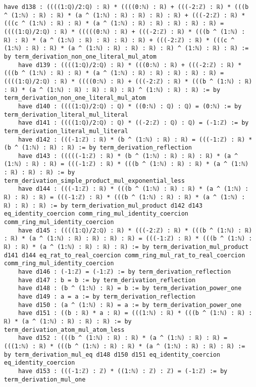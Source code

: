 \documentclass{article}
\begin{document}
\begin{tcolorbox}[colback=white!10, width=\linewidth]
\begin{lstlisting}[language=Lean4]
    have d138 : ((((1:ℚ)/2:ℚ) : ℝ) * ((((0:ℕ) : ℝ) + (((-2:ℤ) : ℝ) * (((b ^ (1:ℕ) : ℝ) : ℝ) * (a ^ (1:ℕ) : ℝ) : ℝ) : ℝ) : ℝ) + (((-2:ℤ) : ℝ) * (((c ^ (1:ℕ) : ℝ) : ℝ) * (a ^ (1:ℕ) : ℝ) : ℝ) : ℝ) : ℝ) : ℝ) = ((((1:ℚ)/2:ℚ) : ℝ) * (((((0:ℕ) : ℝ) + (((-2:ℤ) : ℝ) * (((b ^ (1:ℕ) : ℝ) : ℝ) * (a ^ (1:ℕ) : ℝ) : ℝ) : ℝ) : ℝ) + (((-2:ℤ) : ℝ) * (((c ^ (1:ℕ) : ℝ) : ℝ) * (a ^ (1:ℕ) : ℝ) : ℝ) : ℝ) : ℝ) ^ (1:ℕ) : ℝ) : ℝ) := by term_derivation_non_one_literal_mul_atom
    have d139 : ((((1:ℚ)/2:ℚ) : ℝ) * (((0:ℕ) : ℝ) + (((-2:ℤ) : ℝ) * (((b ^ (1:ℕ) : ℝ) : ℝ) * (a ^ (1:ℕ) : ℝ) : ℝ) : ℝ) : ℝ) : ℝ) = ((((1:ℚ)/2:ℚ) : ℝ) * ((((0:ℕ) : ℝ) + (((-2:ℤ) : ℝ) * (((b ^ (1:ℕ) : ℝ) : ℝ) * (a ^ (1:ℕ) : ℝ) : ℝ) : ℝ) : ℝ) ^ (1:ℕ) : ℝ) : ℝ) := by term_derivation_non_one_literal_mul_atom
    have d140 : ((((1:ℚ)/2:ℚ) : ℚ) * ((0:ℕ) : ℚ) : ℚ) = (0:ℕ) := by term_derivation_literal_mul_literal
    have d141 : ((((1:ℚ)/2:ℚ) : ℚ) * ((-2:ℤ) : ℚ) : ℚ) = (-1:ℤ) := by term_derivation_literal_mul_literal
    have d142 : (((-1:ℤ) : ℝ) * (b ^ (1:ℕ) : ℝ) : ℝ) = (((-1:ℤ) : ℝ) * (b ^ (1:ℕ) : ℝ) : ℝ) := by term_derivation_reflection
    have d143 : (((((-1:ℤ) : ℝ) * (b ^ (1:ℕ) : ℝ) : ℝ) : ℝ) * (a ^ (1:ℕ) : ℝ) : ℝ) = (((-1:ℤ) : ℝ) * (((b ^ (1:ℕ) : ℝ) : ℝ) * (a ^ (1:ℕ) : ℝ) : ℝ) : ℝ) := by term_derivation_simple_product_mul_exponential_less
    have d144 : (((-1:ℤ) : ℝ) * (((b ^ (1:ℕ) : ℝ) : ℝ) * (a ^ (1:ℕ) : ℝ) : ℝ) : ℝ) = (((-1:ℤ) : ℝ) * (((b ^ (1:ℕ) : ℝ) : ℝ) * (a ^ (1:ℕ) : ℝ) : ℝ) : ℝ) := by term_derivation_mul_product d142 d143 eq_identity_coercion comm_ring_mul_identity_coercion comm_ring_mul_identity_coercion
    have d145 : ((((1:ℚ)/2:ℚ) : ℝ) * (((-2:ℤ) : ℝ) * (((b ^ (1:ℕ) : ℝ) : ℝ) * (a ^ (1:ℕ) : ℝ) : ℝ) : ℝ) : ℝ) = (((-1:ℤ) : ℝ) * (((b ^ (1:ℕ) : ℝ) : ℝ) * (a ^ (1:ℕ) : ℝ) : ℝ) : ℝ) := by term_derivation_mul_product d141 d144 eq_rat_to_real_coercion comm_ring_mul_rat_to_real_coercion comm_ring_mul_identity_coercion
    have d146 : (-1:ℤ) = (-1:ℤ) := by term_derivation_reflection
    have d147 : b = b := by term_derivation_reflection
    have d148 : (b ^ (1:ℕ) : ℝ) = b := by term_derivation_power_one
    have d149 : a = a := by term_derivation_reflection
    have d150 : (a ^ (1:ℕ) : ℝ) = a := by term_derivation_power_one
    have d151 : ((b : ℝ) * a : ℝ) = (((1:ℕ) : ℝ) * (((b ^ (1:ℕ) : ℝ) : ℝ) * (a ^ (1:ℕ) : ℝ) : ℝ) : ℝ) := by term_derivation_atom_mul_atom_less
    have d152 : (((b ^ (1:ℕ) : ℝ) : ℝ) * (a ^ (1:ℕ) : ℝ) : ℝ) = (((1:ℕ) : ℝ) * (((b ^ (1:ℕ) : ℝ) : ℝ) * (a ^ (1:ℕ) : ℝ) : ℝ) : ℝ) := by term_derivation_mul_eq d148 d150 d151 eq_identity_coercion eq_identity_coercion
    have d153 : (((-1:ℤ) : ℤ) * ((1:ℕ) : ℤ) : ℤ) = (-1:ℤ) := by term_derivation_mul_one

\end{lstlisting}
\end{tcolorbox}
\end{document}
